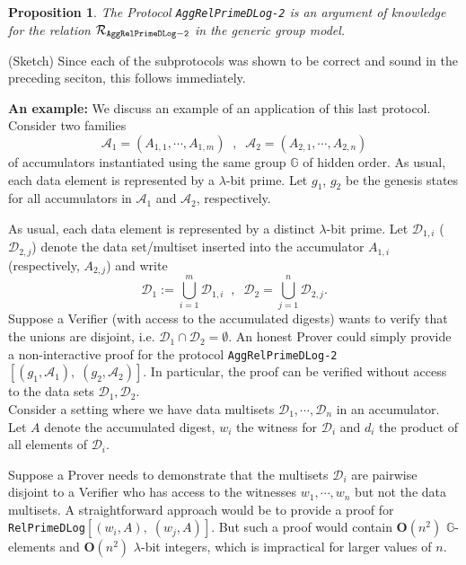 \documentclass[11pt, lettersize, notitlepage, leqno, footskip=0.6cm]{article}
\newcommand{\mc}{\mathcal}
\newcommand{\mb}{\mathbb}
\newcommand{\mbf}{\mathbf}
\newcommand{\lam}{\lambda}
\newcommand{\lamb}{\lambda}
\newtheorem{Prop}[Thm]{Proposition}
\numberwithin{equation}{section}
\begin{document}
\begin{Prop} The Protocol \verb|AggRelPrimeDLog-2| is an argument of knowledge for the relation $\mc{R}_{\tt{AggRelPrimeDLog-2}}$ in the generic group
model.\end{Prop}

\begin{prf} (Sketch) Since each of the subprotocols was shown to be correct and sound in the preceding seciton, this follows immediately.\end{prf}

\noindent \textbf{An example:} We discuss an example of an application of this last protocol. Consider two families \vspace{-0.1cm}$$\mc{A}_1 = (A_{1,1},\cdots,A_{1, m})\;\; , \;\; \mc{A}_2 = (A_{2,1},\cdots,A_{2, n}) $$ of accumulators instantiated using the same group $\mb{G}$ of hidden order. As usual, each data element is represented by a $\lam$-bit prime. Let $g_1$, $g_2$ be the genesis states for all accumulators in $\mc{A}_1$ and $\mc{A}_2$, respectively. 

As usual, each data element is represented by a distinct $\lamb$-bit prime. Let $\mc{D}_{1, i}$ ($\mc{D}_{2, j}$) denote the data set/multiset inserted into the accumulator $A_{1, i}$ (respectively, $A_{2, j}$) and write $$\mc{D}_1 := \bigcup\limits_{i=1}^m  \mc{D}_{1,i}\;\; ,\;\;\mc{D}_2 = \bigcup\limits_{j=1}^n  \mc{D}_{2,j}.$$ Suppose a Verifier (with access to the accumulated digests) wants to verify that the unions are disjoint, i.e. $\mc{D}_1 \cap \mc{D}_2 = \emptyset.$ An honest Prover could simply provide a non-interactive proof for the protocol \verb|AggRelPrimeDLog-2|$[(g_1, \mc{A}_1) ,\;(g_2, \mc{A}_2)]$. In particular, the proof can be verified without access to the data sets $\mc{D}_{1}, \mc{D}_{2}$. \\


Consider a setting where we have data multisets $\mc{D}_1,\cdots, \mc{D}_n$ in an accumulator. Let $A$ denote the accumulated digest, $w_i$ the witness for $\mc{D}_i$ and $d_i$ the product of all elements of $\mc{D}_i$. 

Suppose a Prover needs to demonstrate that the multisets $\mc{D}_i$ are pairwise disjoint to a Verifier who has access to the witnesses $w_1,\cdots,w_n$ but not the data multisets. A straightforward approach would be to provide a proof for \verb|RelPrimeDLog|$[(w_i, A),\;(w_j, A)]$. But such a proof would contain $\mbf{O}(n^2)$ $\mb{G}$-elements and $\mbf{O}(n^2)$ $\lam$-bit integers, which is impractical for larger values of $n$.
\end{document}
